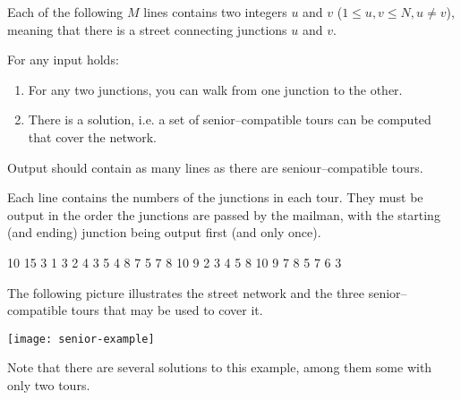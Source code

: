 \documentclass{boi2014}
\begin{document}
    Each of the following $M$ lines contains two integers $u$ and $v$
    ($1 \le u, v \le N, u \neq v$), meaning that
    there is a street connecting junctions $u$ and $v$.

    For any input holds:
    \begin{enumerate}
        \item For any two junctions, you can walk from one junction to the other.
        \item There is a solution, i.e. a set of senior--compatible tours can be
        computed that cover the network.
    \end{enumerate}

    \Output
    Output should contain as many lines as there are seniour--compatible tours.

    Each line contains the numbers of the junctions in each tour. They must be output
    in the order the junctions are passed by the mailman, with the starting (and 
    ending) junction being output first (and only once).


    \Example

    \example
    {
        10 15  3  1 3  2 4  3 5  4 8  7  5 7  8  10  9
    }
    {
        2 3 4 5 8 10 9  7 8  5 7 6 3
    }
    {
        The following picture illustrates the street network and the three
        senior--compatible tours that may be used to cover it.

        \texttt{[image: senior-example]}

        Note that there are several solutions to this example, among them some
        with only two tours.
    
    }
\end{document}
